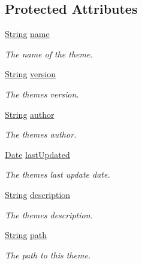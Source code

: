 \subsection*{Protected Attributes}
\begin{DoxyCompactItemize}
\item 
\mbox{\hyperlink{class_rad_j_a_v_1_1_string}{String}} \mbox{\hyperlink{class_rad_j_a_v_1_1_theme_af6fa94694f2e03b411c05e57794c7898}{name}}
\begin{DoxyCompactList}\small\item\em The name of the theme. \end{DoxyCompactList}\item 
\mbox{\hyperlink{class_rad_j_a_v_1_1_string}{String}} \mbox{\hyperlink{class_rad_j_a_v_1_1_theme_a7cd795ecd11078a8416415cee5aec2f3}{version}}
\begin{DoxyCompactList}\small\item\em The theme\textquotesingle{}s version. \end{DoxyCompactList}\item 
\mbox{\hyperlink{class_rad_j_a_v_1_1_string}{String}} \mbox{\hyperlink{class_rad_j_a_v_1_1_theme_adc47f93cb07dbc0ccbd65ad10b85872a}{author}}
\begin{DoxyCompactList}\small\item\em The theme\textquotesingle{}s author. \end{DoxyCompactList}\item 
\mbox{\hyperlink{class_rad_j_a_v_1_1_date}{Date}} \mbox{\hyperlink{class_rad_j_a_v_1_1_theme_a9d52e5e9ee41b7ffad02450a6d516609}{last\+Updated}}
\begin{DoxyCompactList}\small\item\em The theme\textquotesingle{}s last update date. \end{DoxyCompactList}\item 
\mbox{\hyperlink{class_rad_j_a_v_1_1_string}{String}} \mbox{\hyperlink{class_rad_j_a_v_1_1_theme_a87b0854f11d9f9ab8e2743933ff1d861}{description}}
\begin{DoxyCompactList}\small\item\em The theme\textquotesingle{}s description. \end{DoxyCompactList}\item 
\mbox{\hyperlink{class_rad_j_a_v_1_1_string}{String}} \mbox{\hyperlink{class_rad_j_a_v_1_1_theme_aa67c5693e612bc33cf9b7b6d7548c4fc}{path}}
\begin{DoxyCompactList}\small\item\em The path to this theme. \end{DoxyCompactList}\end{DoxyCompactItemize}


